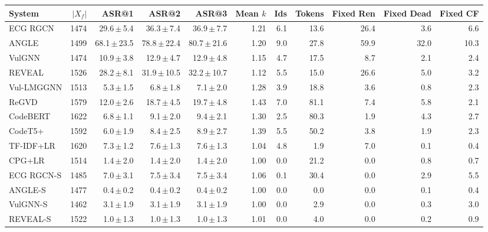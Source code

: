 \begin{tabular}{lrrrrrrrrrr}
\toprule
System & $|X_f|$ & ASR@1 & ASR@2 & ASR@3 & Mean $k$ & Ids & Tokens & Fixed Ren & Fixed Dead & Fixed CF \\
\midrule
ECG RGCN & 1474 & 29.6\,$\pm$\,5.4 & 36.3\,$\pm$\,7.4 & 36.9\,$\pm$\,7.7 & 1.21 & 6.1 & 13.6 & 26.4 & 3.6 & 6.6 \\
ANGLE & 1499 & 68.1\,$\pm$\,23.5 & 78.8\,$\pm$\,22.4 & 80.7\,$\pm$\,21.6 & 1.20 & 9.0 & 27.8 & 59.9 & 32.0 & 10.3 \\
VulGNN & 1474 & 10.9\,$\pm$\,3.8 & 12.9\,$\pm$\,4.7 & 12.9\,$\pm$\,4.8 & 1.15 & 4.7 & 17.5 & 8.7 & 2.1 & 2.4 \\
REVEAL & 1526 & 28.2\,$\pm$\,8.1 & 31.9\,$\pm$\,10.5 & 32.2\,$\pm$\,10.7 & 1.12 & 5.5 & 15.0 & 26.6 & 5.0 & 3.2 \\
Vul-LMGGNN & 1513 & 5.3\,$\pm$\,1.5 & 6.8\,$\pm$\,1.8 & 7.1\,$\pm$\,2.0 & 1.28 & 3.9 & 18.8 & 3.6 & 0.8 & 2.3 \\
ReGVD & 1579 & 12.0\,$\pm$\,2.6 & 18.7\,$\pm$\,4.5 & 19.7\,$\pm$\,4.8 & 1.43 & 7.0 & 81.1 & 7.4 & 5.8 & 2.1 \\
CodeBERT & 1622 & 6.8\,$\pm$\,1.1 & 9.1\,$\pm$\,2.0 & 9.4\,$\pm$\,2.1 & 1.30 & 2.5 & 80.3 & 1.9 & 4.3 & 2.7 \\
CodeT5+ & 1592 & 6.0\,$\pm$\,1.9 & 8.4\,$\pm$\,2.5 & 8.9\,$\pm$\,2.7 & 1.39 & 5.5 & 50.2 & 3.8 & 1.9 & 2.3 \\
TF-IDF+LR & 1620 & 7.3\,$\pm$\,1.2 & 7.6\,$\pm$\,1.3 & 7.6\,$\pm$\,1.3 & 1.04 & 4.8 & 1.9 & 7.0 & 0.1 & 0.4 \\
CPG+LR & 1514 & 1.4\,$\pm$\,2.0 & 1.4\,$\pm$\,2.0 & 1.4\,$\pm$\,2.0 & 1.00 & 0.0 & 21.2 & 0.0 & 0.8 & 0.7 \\
ECG RGCN-S & 1485 & 7.0\,$\pm$\,3.1 & 7.5\,$\pm$\,3.4 & 7.5\,$\pm$\,3.4 & 1.06 & 0.1 & 30.4 & 0.0 & 2.9 & 5.5 \\
ANGLE-S & 1477 & 0.4\,$\pm$\,0.2 & 0.4\,$\pm$\,0.2 & 0.4\,$\pm$\,0.2 & 1.00 & 0.0 & 0.0 & 0.0 & 0.1 & 0.4 \\
VulGNN-S & 1462 & 3.1\,$\pm$\,1.9 & 3.1\,$\pm$\,1.9 & 3.1\,$\pm$\,1.9 & 1.00 & 0.0 & 2.9 & 0.0 & 0.3 & 3.0 \\
REVEAL-S & 1522 & 1.0\,$\pm$\,1.3 & 1.0\,$\pm$\,1.3 & 1.0\,$\pm$\,1.3 & 1.01 & 0.0 & 4.0 & 0.0 & 0.2 & 0.9 \\
\bottomrule
\end{tabular}
